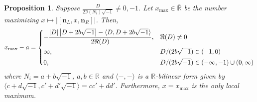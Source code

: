 \documentclass{article}
\theoremstyle{definition}
\theoremstyle{plain}
\newtheorem{proposition}{Proposition}
\theoremstyle{remark}
\numberwithin{equation}{section}
\newcommand{\bR}{\mathbb{R}}
\newcommand{\abs}[1]{\left| {#1} \right|}
\newcommand{\inprod}[2]{\langle {#1}, {#2} \rangle}
\newcommand{\im}{{\sqrt{-1}}}
\def\nsL{{\mathbf{n}_L}}
\def\nsR{{\mathbf{n}_R}}
\begin{document}
\begin{proposition}
  Suppose $\frac{D}{2 \Im(N_i) \im} \neq 0, -1$.
  Let $x_{\max} \in \bar{\bR}$ be the number maximizing $x \mapsto \abs{[\nsL, x, \nsR]}$. Then,
  \begin{equation*}
    x_{\max} - a = \begin{dcases}
      - \frac{\abs{D} \abs{D + 2b \im} - \inprod{D}{D + 2b \im}}{2 \Re(D)}, & \Re(D) \neq 0 \\
      \infty, & D / (2b \im) \in (-1, 0) \\
      0, & D / (2b \im) \in (-\infty, -1) \cup (0, \infty)
    \end{dcases}
  \end{equation*}
  where $N_i = a + b \im$, $a, b \in \bR$
  and $\inprod{-}{-}$ is a $\bR$-bilinear form given by $\inprod{c + d \im}{c' + d' \im} = cc' + dd'$.
  Furthermore, $x = x_{\max}$ is the only local maximum.
\end{proposition}
\end{document}
